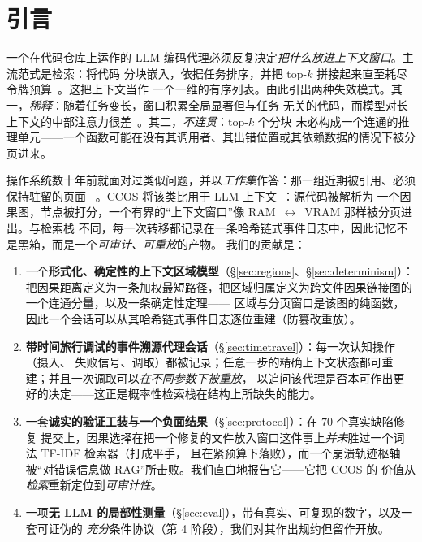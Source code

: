 \documentclass[11pt]{ctexart}
\begin{document}
\section{引言}

一个在代码仓库上运作的 LLM 编码代理必须反复决定\emph{把什么放进上下文窗口}。主流范式是检索：将代码
分块嵌入，依据任务排序，并把 top-$k$ 拼接起来直至耗尽令牌预算~\cite{lewis2020rag}。这把上下文当作
一个一维的有序列表。由此引出两种失效模式。其一，\emph{稀释}：随着任务变长，窗口积累全局显著但与任务
无关的代码，而模型对长上下文的中部注意力很差~\cite{liu2023lost}。其二，\emph{不连贯}：top-$k$ 个分块
未必构成一个连通的推理单元——一个函数可能在没有其调用者、其出错位置或其依赖数据的情况下被分页进来。

操作系统数十年前就面对过类似问题，并以\emph{工作集}作答：那一组近期被引用、必须保持驻留的页面
~\cite{denning1968working}。CCOS 将该类比用于 LLM 上下文~\cite{packer2023memgpt}：源代码被解析为
一个因果图，节点被打分，一个有界的“上下文窗口”像 RAM~$\leftrightarrow$~VRAM 那样被分页进出。与检索栈
不同，每一次转移都记录在一条哈希链式事件日志中，因此记忆不是黑箱，而是一个\emph{可审计、可重放}的产物。
我们的贡献是：

\begin{enumerate}
  \item 一个\textbf{形式化、确定性的上下文区域模型}（\S\ref{sec:regions}、\S\ref{sec:determinism}）：
  把因果距离定义为一条加权最短路径，把区域归属定义为跨文件因果链接图的一个连通分量，以及一条确定性定理——
  区域与分页窗口是该图的纯函数，因此一个会话可以从其哈希链式事件日志逐位重建（防篡改重放）。
  \item \textbf{带时间旅行调试的事件溯源代理会话}（\S\ref{sec:timetravel}）：每一次认知操作（摄入、
  失败信号、调取）都被记录；任意一步的精确上下文状态都可重建；并且一次调取可以\emph{在不同参数下被重放}，
  以追问该代理是否本可作出更好的决定——这正是概率性检索栈在结构上所缺失的能力。
  \item 一套\textbf{诚实的验证工装与一个负面结果}（\S\ref{sec:protocol}）：在 $70$ 个真实缺陷修复
  提交上，因果选择在把一个修复的文件放入窗口这件事上\emph{并未}胜过一个词法 TF-IDF 检索器（打成平手，
  且在紧预算下落败），而一个崩溃轨迹枢轴被“对错误信息做 RAG”所击败。我们直白地报告它——它把 CCOS 的
  价值从\emph{检索}重新定位到\emph{可审计性}。
  \item 一项\textbf{无 LLM 的局部性测量}（\S\ref{sec:eval}），带有真实、可复现的数字，以及一套可证伪的
  \emph{充分}条件协议（第 4 阶段），我们对其作出规约但留作开放。
\end{enumerate}
\end{document}
